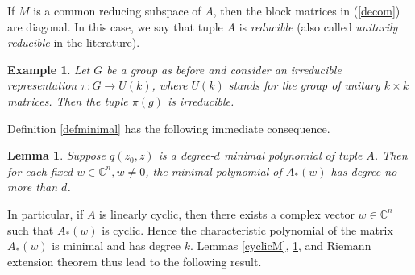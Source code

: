 \documentclass[draft, 12pt, reqno]{amsart}
\newcommand{\C}{{\mathbb C}}
\numberwithin{equation}{section}
\theoremstyle{plain}
\newtheorem{lemma}[theorem]{Lemma}
\newtheorem{example}[theorem]{Example}
\begin{document}
If $M$ is a common reducing subspace of $A$, then the block matrices in (\ref{decom}) are diagonal. In this case, we say that tuple $A$ is {\em reducible} (also called {\em unitarily reducible} in the literature).
\begin{example}
    Let $G$ be a group as before and consider an irreducible representation $\pi: G\to U(k)$, where $U(k)$ stands for the group of unitary $k\times k$ matrices. Then the tuple $\pi(\overline{g})$ is irreducible.
\end{example}

Definition \ref{defminimal} has the following immediate consequence.
\begin{lemma}\label{minip}
Suppose $q(z_0,z)$ is a degree-$d$ minimal polynomial of tuple $A$. Then for each fixed $w\in \C^n, w\neq 0$, the minimal polynomial of $A_*(w)$ has degree no more than $d$.
\end{lemma}
   
\noindent In particular, if $A$ is linearly cyclic, then there exists a complex vector $w\in \C^n$ such that $A_*(w)$ is cyclic. Hence the characteristic polynomial of the matrix $A_*(w)$ is minimal and has degree $k$. Lemmas \ref{cyclicM}, \ref{minip}, and Riemann extension theorem thus lead to the following result. 
\end{document}
